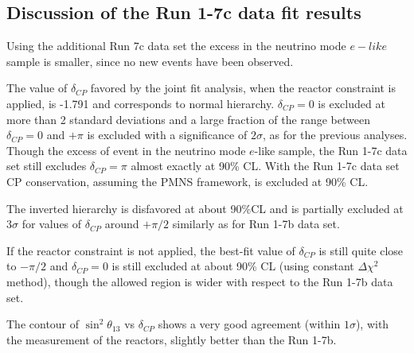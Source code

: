 %
%

\subsection {Discussion of the Run 1-7c data fit results}
\label{sec:results_discussion_run17c}

Using the additional Run 7c data set the excess in the neutrino mode $e-like$ sample 
is smaller, since no new events have been observed.

The value of $\delta_{CP}$ favored by the joint fit analysis, when the reactor constraint is applied, 
is -1.791 and corresponds to normal hierarchy.
$\delta_{CP} = 0$ is excluded at more than 2 standard deviations and a large fraction of the range between $\delta_{CP} = 0$ and $+\pi$
is excluded with a significance of $2 \sigma$, as for the previous analyses.
Though the excess of event in the neutrino mode $e$-like sample,
the Run 1-7c data set still excludes $\delta_{CP} = \pi$ almost exactly at 90\% CL.
With the Run 1-7c data set CP conservation, assuming the PMNS framework, is excluded at 90\% CL. 

The inverted hierarchy is disfavored at about 90\%CL and is partially 
excluded at $3\sigma$ for values of $\delta_{CP}$ around $+\pi/2$ similarly as for Run 1-7b data set.

If the reactor constraint is not applied, the best-fit value of $\delta_{CP}$ is still quite close to $-\pi/2$
and $\delta_{CP}=0$ is still excluded at about 90\% CL (using constant $\Delta \chi^2$ method),
though the allowed region is wider with respect to the Run 1-7b data set.

The contour of $\sin^2 \theta_{13}$ vs $\delta_{CP}$ shows a very good agreement (within $1 \sigma$),
with the measurement of the reactors, slightly better than the Run 1-7b.


\clearpage




